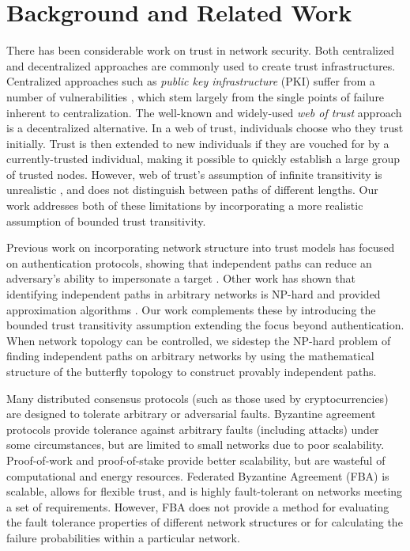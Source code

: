 \documentclass[sigconf]{acmart}
\begin{document}
\section{Background and Related Work}
\label{sec-related}

There has been considerable work on trust in network security.
Both centralized and decentralized approaches are commonly used to create
trust infrastructures.
Centralized approaches such as {\em public key infrastructure} (PKI)
suffer from a number of vulnerabilities
\cite{ellison_ten_2000},
which stem largely from the single points of failure inherent to
centralization.
The well-known and widely-used {\em web of trust} approach
\cite{zimmermann_official_1995,ferguson_practical_2003}
is a decentralized alternative.
In a web of trust,
individuals choose who they trust initially.
Trust is then extended to new individuals if they are vouched for by a
currently-trusted individual,
making it possible to quickly establish a large group of trusted nodes.
However, web of trust's assumption of infinite transitivity is unrealistic
\cite{christianson_why_1997},
and does not distinguish between paths of different lengths.
Our work addresses both of these limitations by incorporating a more realistic
assumption of bounded trust transitivity.

Previous work on incorporating network structure into
trust models has focused on authentication
protocols, showing that independent paths can reduce an adversary's ability
to impersonate a target
\cite{levien_attack-resistant_2009}.
Other work has shown that identifying independent paths in arbitrary networks
is NP-hard and provided approximation algorithms
\cite{reiter_resilient_1998}.
Our work complements these by introducing the bounded trust transitivity assumption
extending the focus beyond authentication.
When network topology can be controlled, we sidestep the NP-hard problem of finding
independent paths on arbitrary networks by using the mathematical structure of
the butterfly topology to construct provably independent paths.

Many distributed consensus protocols (such as those used by cryptocurrencies)
are designed to tolerate arbitrary or adversarial faults.
Byzantine agreement protocols
\cite{lamport_byzantine_1982,castro_practical_1999}
provide tolerance against arbitrary faults (including attacks) under
some circumstances, but are limited to small networks due to poor scalability.
Proof-of-work \cite{dwork_pricing_1993,nakamoto_bitcoin:_2008}
and proof-of-stake \cite{king_ppcoin:_2012}
provide better scalability,
but are wasteful of computational and energy resources.
Federated Byzantine Agreement (FBA) \cite{mazieres_stellar_2015}
is scalable, allows for flexible trust,
and is highly fault-tolerant on networks meeting a set of requirements.
However, FBA does not provide a method for evaluating the
fault tolerance properties of different network structures
or for calculating the failure probabilities within a particular network.
\end{document}
